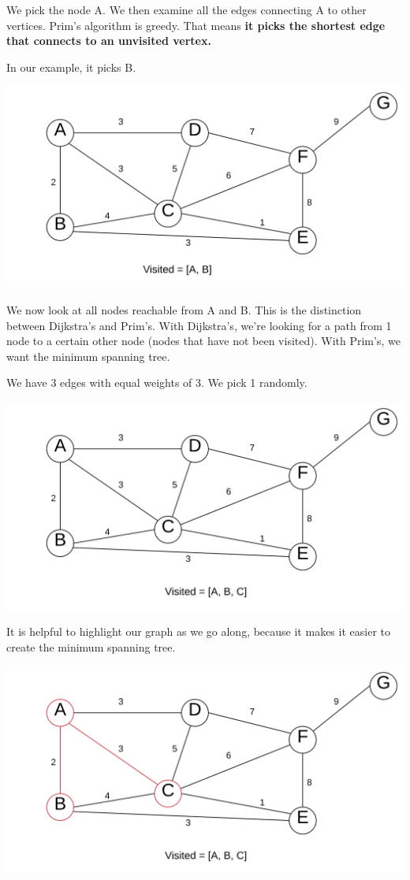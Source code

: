 \documentclass{article}
\begin{document}
We pick the node A. We then examine all the edges connecting A to other vertices. Prim's algorithm is greedy. That means \textbf{it picks the shortest edge that connects to an unvisited vertex.}

In our example, it picks B.

\includegraphics[width=\textwidth,height=\textheight,keepaspectratio]{3.png}

We now look at all nodes reachable from A and B. This is the distinction between Dijkstra's and Prim's. With Dijkstra's, we're looking for a path from 1 node to a certain other node (nodes that have not been visited). With Prim's, we want the minimum spanning tree. 

We have 3 edges with equal weights of 3. We pick 1 randomly.

\includegraphics[width=\textwidth,height=\textheight,keepaspectratio]{4.png}

It is helpful to highlight our graph as we go along, because it makes it easier to create the minimum spanning tree.

\includegraphics[width=\textwidth,height=\textheight,keepaspectratio]{5.png}
\end{document}
